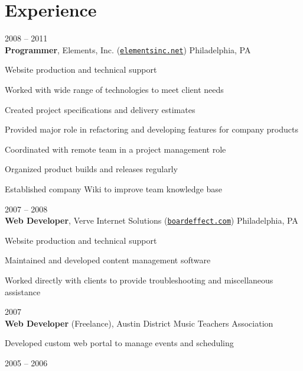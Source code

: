 \documentclass[11pt]{article}
\begin{document}
\section*{Experience}
\begin{description*}
    \item[2008 -- 2011]\hfill\\
        \textbf{Programmer}, Elements, Inc. (\href{http://elementsinc.net}{\texttt{elementsinc.net}}) \hfill Philadelphia, PA
        \begin{itemize*}
            \item Website production and technical support
            \item Worked with wide range of technologies to meet client needs
            \item Created project specifications and delivery estimates
            \item Provided major role in refactoring and developing features for company products
            \item Coordinated with remote team in a project management role
            \item Organized product builds and releases regularly
            \item Established company Wiki to improve team knowledge base
        \end{itemize*}
    \item[2007 -- 2008]\hfill\\
        \textbf{Web Developer}, Verve Internet Solutions (\href{http://boardeffect.com}{\texttt{boardeffect.com}}) \hfill Philadelphia, PA
        \begin{itemize*}
            \item Website production and technical support
            \item Maintained and developed content management software
            \item Worked directly with clients to provide troubleshooting and miscellaneous assistance
        \end{itemize*}
    \item[2007]\hfill\\
        \textbf{Web Developer} (Freelance), Austin District Music Teachers Association \hfill
        \begin{itemize*}
            \item Developed custom web portal to manage events and scheduling
        \end{itemize*}
    \item[2005 -- 2006]\hfill\\

\end{description*}
\end{document}
